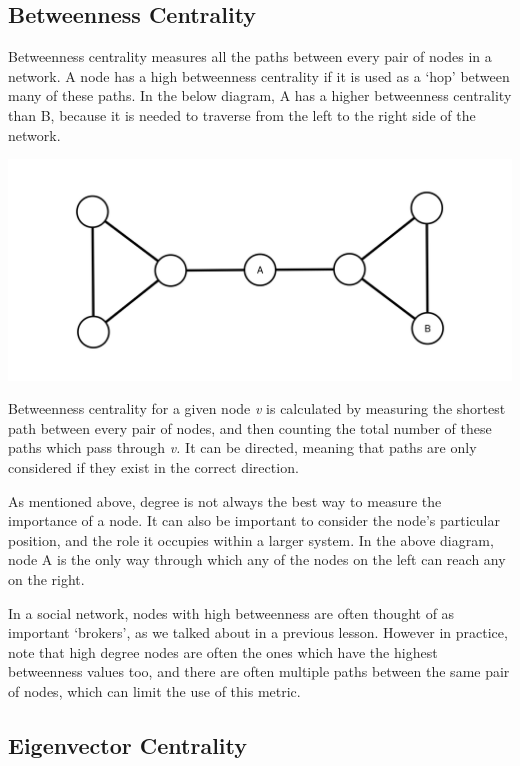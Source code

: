 \documentclass[
]{book}
\begin{document}
\hypertarget{betweenness-centrality}{%
\subsection{Betweenness Centrality}\label{betweenness-centrality}}

Betweenness centrality measures all the paths between every pair of nodes in a network. A node has a high betweenness centrality if it is used as a `hop' between many of these paths. In the below diagram, A has a higher betweenness centrality than B, because it is needed to traverse from the left to the right side of the network.

\includegraphics{images/betweenness.png}

Betweenness centrality for a given node \emph{v} is calculated by measuring the shortest path between every pair of nodes, and then counting the total number of these paths which pass through \emph{v.} It can be directed, meaning that paths are only considered if they exist in the correct direction.

As mentioned above, degree is not always the best way to measure the importance of a node. It can also be important to consider the node's particular position, and the role it occupies within a larger system. In the above diagram, node A is the only way through which any of the nodes on the left can reach any on the right.

In a social network, nodes with high betweenness are often thought of as important `brokers', as we talked about in a previous lesson. However in practice, note that high degree nodes are often the ones which have the highest betweenness values too, and there are often multiple paths between the same pair of nodes, which can limit the use of this metric.

\hypertarget{eigenvector-centrality}{%
\subsection{Eigenvector Centrality}\label{eigenvector-centrality}}
\end{document}
